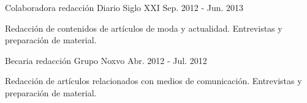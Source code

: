 \begin{cventries}
  \cventry
    {Colaboradora redacción} %
    {Diario Siglo XXI} %
    {} %
    {Sep. 2012 - Jun. 2013} %
    {
      \begin{cvitems} %
        \item {Redacción de contenidos de artículos de moda y actualidad. Entrevistas y preparación de material.}
      \end{cvitems}
    }

  \cventry
    {Becaria redacción} %
    {Grupo Noxvo} %
    {} %
    {Abr. 2012 - Jul. 2012} %
    {
      \begin{cvitems} %
        \item {Redacción de artículos relacionados con medios de comunicación. Entrevistas y preparación de material.}
      \end{cvitems}
    }

\end{cventries}
